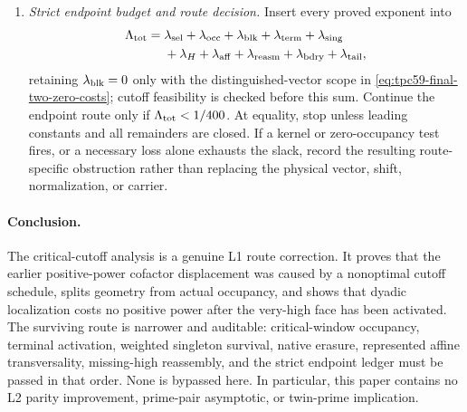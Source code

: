 \begin{enumerate}[label=\textbf{Door \Alph*.},leftmargin=3.8em]
 \item \emph{Strict endpoint budget and route decision.}
       Insert every proved exponent into
       \begin{equation}
        \begin{aligned}
        \Lambda_{\rm tot}={}&
        \lambda_{\rm sel}+\lambda_{\rm occ}
        +\lambda_{\rm blk}
        +\lambda_{\rm term}+\lambda_{\rm sing}\\
        &+\lambda_H+\lambda_{\rm aff}
        +\lambda_{\rm reasm}
        +\lambda_{\rm bdry}+\lambda_{\rm tail},
        \end{aligned}
        \label{eq:tpc59-next-complete-budget}
       \end{equation}
       retaining \(\lambda_{\rm blk}=0\) only with the distinguished-vector
       scope in \eqref{eq:tpc59-final-two-zero-costs}; cutoff feasibility is
       checked before this sum.  Continue the endpoint
       route only if \(\Lambda_{\rm tot}<1/400\).  At equality, stop unless
       leading constants and all remainders are closed.  If a kernel or
       zero-occupancy test fires, or a necessary loss alone exhausts the
       slack, record the resulting route-specific obstruction rather than
       replacing the physical vector, shift, normalization, or carrier.
\end{enumerate}

\paragraph{Conclusion.}
The critical-cutoff analysis is a genuine L1 route correction.  It proves
that the earlier positive-power cofactor displacement was caused by a
nonoptimal cutoff schedule, splits geometry from actual occupancy, and
shows that dyadic localization costs no positive power after the very-high
face has been activated.  The surviving route is narrower and auditable:
 critical-window occupancy, terminal activation, weighted singleton
 survival, native erasure, represented affine transversality, missing-high
 reassembly, and the strict endpoint ledger must be passed in that order.
 None is bypassed here.  In
particular, this paper contains no L2 parity improvement, prime-pair
asymptotic, or twin-prime implication.
